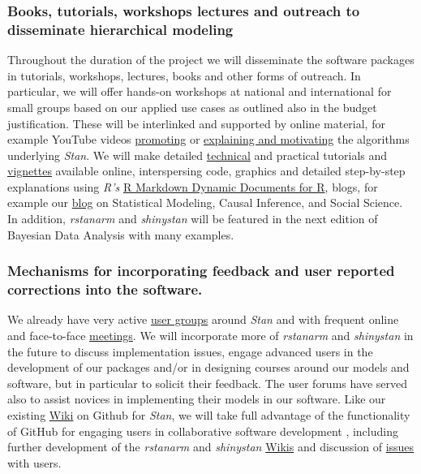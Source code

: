 \documentclass[11pt,notitlepage]{article}
\begin{document}
\subsubsection*{Books, tutorials, workshops lectures and outreach to disseminate hierarchical modeling}
Throughout the duration of the project we will disseminate the software packages in tutorials, workshops, lectures, books and other forms 
of outreach. In particular, we will offer hands-on workshops at national and international for small groups based on our applied use cases 
as outlined also in the budget justification. These will be interlinked and supported by online material, for 
example YouTube videos \href{https://www.youtube.com/watch?v=pWow8Qe1snQ}{promoting} or 
\href{https://www.youtube.com/watch?v=pHsuIaPbNbY}{explaining and motivating} the algorithms underlying \textit{Stan}. We will make 
detailed \href{http://mc-stan.org/documentation/}{technical} and practical tutorials and 
\href{https://cran.r-project.org/web/packages/rstanarm/vignettes/aov.html}{vignettes} available online, interspersing code, graphics 
and detailed step-by-step explanations using \textit{R's}  \href{http://rmarkdown.rstudio.com/}{R Markdown \- Dynamic Documents for R}, 
blogs, for example our \href{http://andrewgelman.com/}{blog} on Statistical Modeling, Causal Inference, and Social Science. In addition, 
\textit{rstanarm} and \textit{shinystan} will be featured in the next edition of Bayesian Data Analysis with many examples\cite{Gelman-Hill_2014}.

\subsubsection*{Mechanisms for incorporating feedback and user reported corrections into the software.}

We already have very active \href{https://groups.google.com/forum/#!forum/stan-users} {user groups} around \textit{Stan} and 
with frequent online and face-to-face \href{http://www.meetup.com/bda-group/}{meetings}. We will incorporate more of
\textit{rstanarm} and \textit{shinystan} in the future to discuss implementation issues, engage advanced users in the development of 
our packages and/or in designing courses around our models and software, but in particular to solicit their feedback. The user 
forums have served also to assist novices in implementing their models in our software.
Like our existing \href{https://github.com/stan-dev/example-models/wiki}{Wiki} on Github for \textit{Stan}, we will 
take full advantage of the functionality of GitHub for engaging users in collaborative software development \cite{loeliger2012version}, 
including further development of the \textit{rstanarm} and \textit{shinystan} 
\href{https://github.com/stan-dev/rstanarm/wiki}{Wikis} and discussion of \href{https://github.com/stan-dev/rstanarm/issues}{issues} with users.
\end{document}
